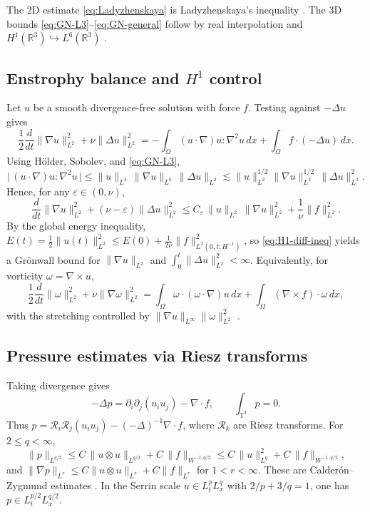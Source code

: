 \IfFileExists{nyjm.cls}{\documentclass[11pt]{nyjm}}{\documentclass[11pt]{amsart}}
\newcommand{\R}{\mathbb{R}}
\newcommand{\T}{\mathbb{T}}
\theoremstyle{plain}
\theoremstyle{definition}
\theoremstyle{remark}
\begin{document}
\noindent The 2D estimate \eqref{eq:Ladyzhenskaya} is Ladyzhenskaya’s inequality \cite{Ladyzhenskaya1969}. The 3D bounds \eqref{eq:GN-L3}–\eqref{eq:GN-general} follow by real interpolation and $H^1(\R^3)\hookrightarrow L^6(\R^3)$ \cite{Gagliardo1959,Nirenberg1959,Temam2001,Sohr2001}.

\subsection{Enstrophy balance and $H^1$ control}\label{subsec:enstrophy}
Let $u$ be a smooth divergence-free solution with force $f$. Testing against $-\Delta u$ gives
\begin{equation}\label{eq:H1-balance}
\frac12\frac{d}{dt}\|\nabla u\|_{L^2}^2+\nu\|\Delta u\|_{L^2}^2
= -\int_{\Omega}(u\cdot\nabla)u:\nabla^2 u\,dx+\int_{\Omega} f\cdot(-\Delta u)\,dx.
\end{equation}
Using Hölder, Sobolev, and \eqref{eq:GN-L3},
\[
\big|\,(u\cdot\nabla)u:\nabla^2 u\,\big|
\le \|u\|_{L^3}\,\|\nabla u\|_{L^6}\,\|\Delta u\|_{L^2}
\lesssim \|u\|_{L^2}^{1/2}\|\nabla u\|_{L^2}^{1/2}\,\|\Delta u\|_{L^2}^2.
\]
Hence, for any $\varepsilon\in(0,\nu)$,
\begin{equation}\label{eq:H1-diff-ineq}
\frac{d}{dt}\|\nabla u\|_{L^2}^2+(\nu-\varepsilon)\|\Delta u\|_{L^2}^2
\le C_\varepsilon\,\|u\|_{L^2}\,\|\nabla u\|_{L^2}^2+\frac{1}{\nu}\|f\|_{L^2}^2.
\end{equation}
By the global energy inequality, $E(t)=\tfrac12\|u(t)\|_{L^2}^2\le E(0)+\tfrac{1}{2\nu}\|f\|_{L^2(0,t;H^{-1})}^2$, so \eqref{eq:H1-diff-ineq} yields a Grönwall bound for $\|\nabla u\|_{L^2}$ and $\int_0^t\|\Delta u\|_{L^2}^2<\infty$. Equivalently, for vorticity $\omega=\nabla\times u$,
\begin{equation}\label{eq:enstrophy}
\frac12\frac{d}{dt}\|\omega\|_{L^2}^2+\nu\|\nabla\omega\|_{L^2}^2
=\int_{\Omega}\omega\cdot(\omega\cdot\nabla)u\,dx+\int_{\Omega}(\nabla\times f)\cdot\omega\,dx,
\end{equation}
with the stretching controlled by $\|\nabla u\|_{L^\infty}\|\omega\|_{L^2}^2$ \cite{ConstantinFoias1988,Temam2001,Sohr2001}.

\subsection{Pressure estimates via Riesz transforms}\label{subsec:pressure}
Taking divergence gives
\begin{equation}\label{eq:pressure-Poisson}
-\Delta p=\partial_i\partial_j(u_i u_j)-\nabla\!\cdot f,\qquad \int_{\T^3}p=0.
\end{equation}
Thus $p=\mathcal R_i\mathcal R_j(u_i u_j)-(-\Delta)^{-1}\nabla\!\cdot f$, where $\mathcal R_k$ are Riesz transforms. For $2\le q<\infty$,
\begin{equation}\label{eq:pressure-Lq}
\|p\|_{L^{q/2}}\le C\,\|u\otimes u\|_{L^{q/2}}+C\,\|f\|_{W^{-1,q/2}}
\le C\,\|u\|_{L^{q}}^2 + C\,\|f\|_{W^{-1,q/2}},
\end{equation}
and $\|\nabla p\|_{L^r}\le C\|u\otimes u\|_{L^r}+C\|f\|_{L^r}$ for $1<r<\infty$. These are Calderón--Zygmund estimates \cite{Stein1993,Sohr2001,Temam2001}. In the Serrin scale $u\in L^p_tL^q_x$ with $2/p+3/q=1$, one has $p\in L^{p/2}_tL^{q/2}_x$.
\end{document}
